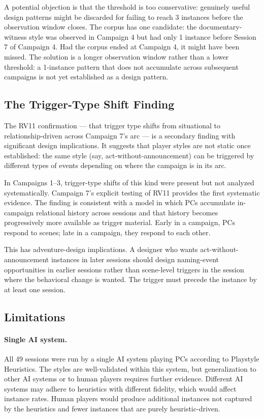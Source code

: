 A potential objection is that the threshold is too conservative: genuinely useful design
patterns might be discarded for failing to reach 3 instances before the observation
window closes. The corpus has one candidate: the documentary-witness style was observed
in Campaign 4 but had only 1 instance before Session 7 of Campaign 4. Had the corpus
ended at Campaign 4, it might have been missed. The solution is a longer observation
window rather than a lower threshold: a 1-instance pattern that does not accumulate
across subsequent campaigns is not yet established as a design pattern.

\subsection{The Trigger-Type Shift Finding}

The RV11 confirmation --- that trigger type shifts from situational to relationship-driven
across Campaign 7's arc --- is a secondary finding with significant design implications.
It suggests that player styles are not static once established: the same style (say,
act-without-announcement) can be triggered by different types of events depending on
where the campaign is in its arc.

In Campaigns 1--3, trigger-type shifts of this kind were present but not analyzed
systematically. Campaign 7's explicit testing of RV11 provides the first systematic
evidence. The finding is consistent with a model in which PCs accumulate in-campaign
relational history across sessions and that history becomes progressively more available
as trigger material. Early in a campaign, PCs respond to scenes; late in a campaign,
they respond to each other.

This has adventure-design implications. A designer who wants act-without-announcement
instances in later sessions should design naming-event opportunities in earlier sessions
rather than scene-level triggers in the session where the behavioral change is wanted.
The trigger must precede the instance by at least one session.

\subsection{Limitations}

\paragraph{Single AI system.}
All 49 sessions were run by a single AI system playing PCs according to Playstyle
Heuristics. The styles are well-validated within this system, but generalization to
other AI systems or to human players requires further evidence. Different AI systems
may adhere to heuristics with different fidelity, which would affect instance rates.
Human players would produce additional instances not captured by the heuristics and
fewer instances that are purely heuristic-driven.

